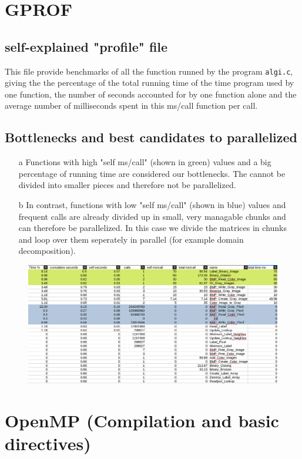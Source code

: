 \documentclass[11pt,a4paper]{article}
\begin{document}
\section{GPROF}
\subsection{self-explained "profile" file}
This file provide benchmarks of all the function runned by the program \texttt{algi.c}, giving the the percentage of the total running time of the time program used by one function, the number of seconds accounted for by one function alone and the average number of milliseconds spent in this ms/call function per call.
\subsection{Bottlenecks and best candidates to parallelized}
\begin{itemize}
\item[a] Functions with high "self ms/call" (shown in green) values and a big percentage of running time are considered our bottlenecks. The cannot be divided into smaller pieces and therefore not be parallelized.
\item[b] In contrast, functions with low "self ms/call" (shown in blue) values and frequent calls are already divided up in small, very managable chunks and can therefore be parallelized. In this case we divide the matrices in chunks and loop over them seperately in parallel (for example domain decomposition).
\end{itemize}
\begin{figure}[h]
\centering
\includegraphics[width=\textwidth]{foto/calls.png}
\end{figure}
\newpage
\section{OpenMP (Compilation and basic directives)}
\end{document}
